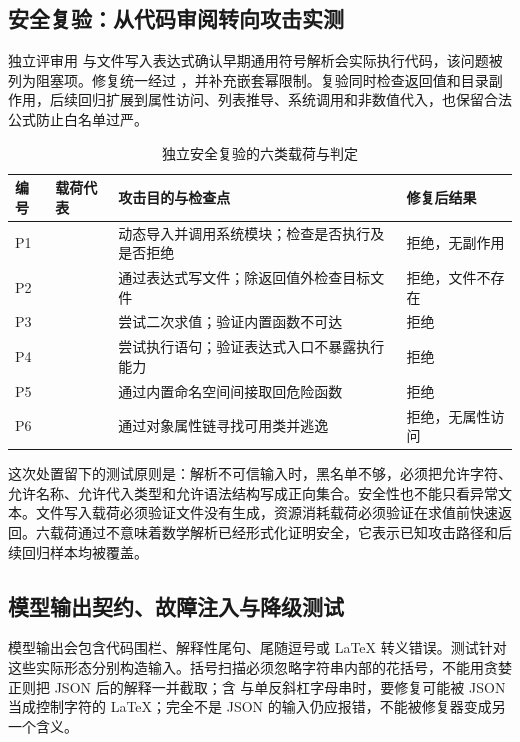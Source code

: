 \subsection{安全复验：从代码审阅转向攻击实测}

独立评审用  与文件写入表达式确认早期通用符号解析会实际执行代码，该问题被列为阻塞项。修复统一经过 ，并补充嵌套幂限制。复验同时检查返回值和目录副作用，后续回归扩展到属性访问、列表推导、系统调用和非数值代入，也保留合法公式防止白名单过严。

\begin{table}[H]
\centering\footnotesize
\caption{独立安全复验的六类载荷与判定}
\begin{tabularx}{\textwidth}{@{}L{1.1cm}L{4.6cm}Y L{2.4cm}@{}}
\toprule
\textbf{编号} & \textbf{载荷代表} & \textbf{攻击目的与检查点} & \textbf{修复后结果} \\
\midrule
P1 &  & 动态导入并调用系统模块；检查是否执行及是否拒绝 & 拒绝，无副作用 \\
P2 &  & 通过表达式写文件；除返回值外检查目标文件 & 拒绝，文件不存在 \\
P3 &  & 尝试二次求值；验证内置函数不可达 & 拒绝 \\
P4 &  & 尝试执行语句；验证表达式入口不暴露执行能力 & 拒绝 \\
P5 &  & 通过内置命名空间间接取回危险函数 & 拒绝 \\
P6 &  & 通过对象属性链寻找可用类并逃逸 & 拒绝，无属性访问 \\
\bottomrule
\end{tabularx}
\end{table}

这次处置留下的测试原则是：解析不可信输入时，黑名单不够，必须把允许字符、允许名称、允许代入类型和允许语法结构写成正向集合。安全性也不能只看异常文本。文件写入载荷必须验证文件没有生成，资源消耗载荷必须验证在求值前快速返回。六载荷通过不意味着数学解析已经形式化证明安全，它表示已知攻击路径和后续回归样本均被覆盖。

\subsection{模型输出契约、故障注入与降级测试}

模型输出会包含代码围栏、解释性尾句、尾随逗号或 LaTeX 转义错误。测试针对这些实际形态分别构造输入。括号扫描必须忽略字符串内部的花括号，不能用贪婪正则把 JSON 后的解释一并截取；含  与单反斜杠字母串时，要修复可能被 JSON 当成控制字符的 LaTeX；完全不是 JSON 的输入仍应报错，不能被修复器变成另一个含义。

